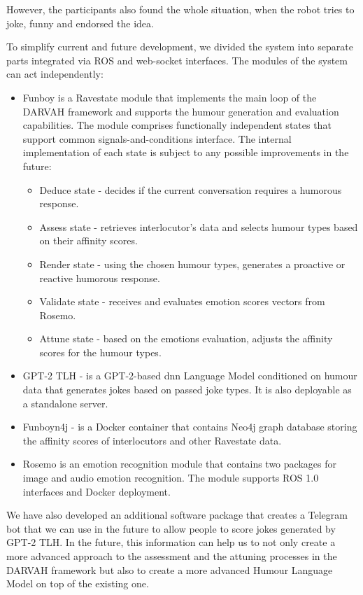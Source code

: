 However, the participants also found the whole situation, when the robot tries to joke, funny and endorsed the idea. 

To simplify current and future development, we divided the system into separate parts integrated via ROS and web-socket interfaces. The modules of the system can act independently:

\begin{itemize}
    \item Funboy is a Ravestate module that implements the main loop of the DARVAH framework and supports the humour generation and evaluation capabilities. The module comprises functionally independent states that support common signals-and-conditions interface. The internal implementation of each state is subject to any possible improvements in the future:
    \begin{itemize}
        \item Deduce state - decides if the current conversation requires a humorous response.
        \item Assess state - retrieves interlocutor's data and selects humour types based on their affinity scores.
        \item Render state - using the chosen humour types, generates a proactive or reactive humorous response.
        \item Validate state - receives and evaluates emotion scores vectors from Rosemo. 
        \item Attune state - based on the emotions evaluation, adjusts the affinity scores for the humour types.
    \end{itemize}
    \item GPT-2 TLH - is a GPT-2-based \acrshort{dnn} Language Model conditioned on humour data that generates jokes based on passed joke types. It is also deployable as a standalone server.
    \item Funboyn4j - is a Docker container that contains Neo4j graph database storing the affinity scores of interlocutors and other Ravestate data.
    \item Rosemo is an emotion recognition module that contains two packages for image and audio emotion recognition. The module supports ROS 1.0 interfaces and Docker deployment.
\end{itemize}

We have also developed an additional software package that creates a Telegram bot that we can use in the future to allow people to score jokes generated by GPT-2 TLH. In the future, this information can help us to not only create a more advanced approach to the assessment and the attuning processes in the DARVAH framework but also to create a more advanced Humour Language Model on top of the existing one. 

